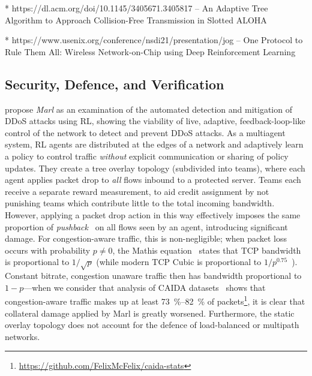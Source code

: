* https://dl.acm.org/doi/10.1145/3405671.3405817 -- An Adaptive Tree Algorithm to Approach Collision-Free Transmission in Slotted ALOHA

* https://www.usenix.org/conference/nsdi21/presentation/jog -- One Protocol to Rule Them All: Wireless Network-on-Chip using Deep Reinforcement Learning

\subsection{Security, Defence, and Verification}
\textcite{DBLP:journals/eaai/MalialisK15} propose \emph{Marl} as an examination of the automated detection and mitigation of DDoS attacks using RL, showing the viability of live, adaptive, feedback-loop-like control of the network to detect and prevent DDoS attacks.
As a multiagent system, RL agents are distributed at the edges of a network and adaptively learn a policy to control traffic \emph{without} explicit communication or sharing of policy updates.
They create a tree overlay topology (subdivided into teams), where each agent applies packet drop to \emph{all} flows inbound to a protected server.
Teams each receive a separate reward measurement, to aid credit assignment by not punishing teams which contribute little to the total incoming bandwidth.
However, applying a packet drop action in this way effectively imposes the same proportion of \emph{pushback}~\cite{DBLP:journals/ccr/MahajanBFIPS02a} on all flows seen by an agent, introducing significant damage.
For congestion-aware traffic, this is non-negligible; when packet loss occurs with probability $p\ne0$, the Mathis equation~\cite{DBLP:journals/ccr/MathisSMO97} states that TCP bandwidth is proportional to $1/\sqrt{p}$ (while modern TCP Cubic is proportional to $1/p^{0.75}$~\cite{rfc8312}).
Constant bitrate, congestion unaware traffic then has bandwidth proportional to $1 - p$---when we consider that analysis of CAIDA datasets~\cite{caida-2018-passive} shows that congestion-aware traffic makes up at least \SIrange{73}{82}{\percent} of packets\footnote{\url{https://github.com/FelixMcFelix/caida-stats}}, it is clear that collateral damage applied by Marl is greatly worsened.
Furthermore, the static overlay topology does not account for the defence of load-balanced or multipath networks.

